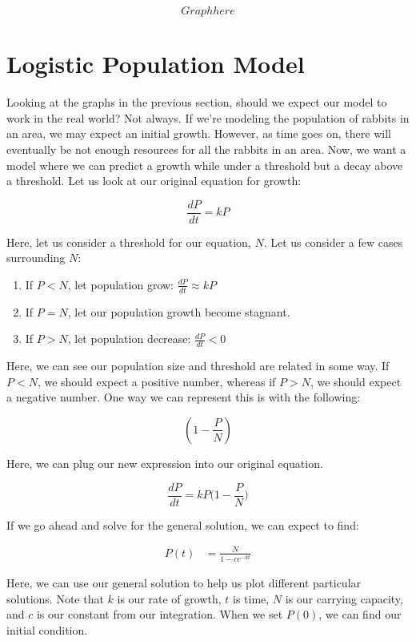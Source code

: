 \documentclass{amsart}
\theoremstyle{definition}
\numberwithin{equation}{section}
\begin{document}
\begin{sansmath}
\[ Graph here \]

\section{Logistic Population Model}

Looking at the graphs in the previous section, should we expect our model to work in the real world? Not always. If we're modeling the population of rabbits in an area, we may expect an initial growth. However, as time goes on, there will eventually be not enough resources for all the rabbits in an area. Now, we want a model where we can predict a growth while under a threshold but a decay above a threshold. Let us look at our original equation for growth:

\[ \frac{dP}{dt} = kP \]

Here, let us consider a threshold for our equation, $N$. Let us consider a few cases surrounding $N$:

\begin{enumerate}
  \item If $P < N$, let population grow: $\frac{dP}{dt} \approx kP$
  \item If $P = N$, let our population growth become stagnant.
  \item If $P > N$, let population decrease: $\frac{dP}{dt} < 0$
\end{enumerate}

Here, we can see our population size and threshold are related in some way. If $P < N$, we should expect a positive number, whereas if $P > N$, we should expect a negative number. One way we can represent this is with the following:

\[ (1 - \frac{P}{N} )\]

Here, we can plug our new expression into our original equation.

\[ \frac{dP}{dt} = kP \Big(1 - \frac{P}{N} \Big) \]

If we go ahead and solve for the general solution, we can expect to find:

\begin{align*}
  P(t) & = \frac{N}{1 - ce^{-kt}}
\end{align*}

Here, we can use our general solution to help us plot different particular solutions. Note that $k$ is our rate of growth, $t$ is time, $N$ is our carrying capacity, and $c$ is our constant from our integration. When we set $P(0)$, we can find our initial condition.


\end{sansmath}
\end{document}
